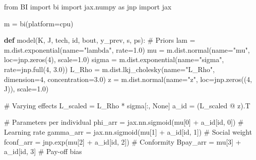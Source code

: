 \documentclass[
  letterpaper,
  DIV=11,
  numbers=noendperiod]{scrartcl}
\newenvironment{Shaded}{\begin{snugshade}}{\end{snugshade}}
\newcommand{\BuiltInTok}[1]{\textcolor[rgb]{0.00,0.23,0.31}{#1}}
\newcommand{\CommentTok}[1]{\textcolor[rgb]{0.37,0.37,0.37}{#1}}
\newcommand{\DecValTok}[1]{\textcolor[rgb]{0.68,0.00,0.00}{#1}}
\newcommand{\FloatTok}[1]{\textcolor[rgb]{0.68,0.00,0.00}{#1}}
\newcommand{\ImportTok}[1]{\textcolor[rgb]{0.00,0.46,0.62}{#1}}
\newcommand{\KeywordTok}[1]{\textcolor[rgb]{0.00,0.23,0.31}{\textbf{#1}}}
\newcommand{\NormalTok}[1]{\textcolor[rgb]{0.00,0.23,0.31}{#1}}
\newcommand{\OperatorTok}[1]{\textcolor[rgb]{0.37,0.37,0.37}{#1}}
\newcommand{\StringTok}[1]{\textcolor[rgb]{0.13,0.47,0.30}{#1}}
\newcommand{\VariableTok}[1]{\textcolor[rgb]{0.07,0.07,0.07}{#1}}
\begin{document}
\begin{Shaded}
\begin{Highlighting}[]
\ImportTok{from}\NormalTok{ BI }\ImportTok{import}\NormalTok{ bi}
\ImportTok{import}\NormalTok{ jax.numpy }\ImportTok{as}\NormalTok{ jnp}
\ImportTok{import}\NormalTok{ jax}

\NormalTok{m }\OperatorTok{=}\NormalTok{ bi(platform}\OperatorTok{=}\StringTok{\textquotesingle{}cpu\textquotesingle{}}\NormalTok{)}

\KeywordTok{def}\NormalTok{ model(K, J, tech, }\BuiltInTok{id}\NormalTok{, bout, y\_prev, s, ps):}
    \CommentTok{\# Priors}
\NormalTok{    lam   }\OperatorTok{=}\NormalTok{ m.dist.exponential(name}\OperatorTok{=}\StringTok{"lambda"}\NormalTok{, rate}\OperatorTok{=}\FloatTok{1.0}\NormalTok{)}
\NormalTok{    mu    }\OperatorTok{=}\NormalTok{ m.dist.normal(name}\OperatorTok{=}\StringTok{"mu"}\NormalTok{, loc}\OperatorTok{=}\NormalTok{jnp.zeros(}\DecValTok{4}\NormalTok{), scale}\OperatorTok{=}\FloatTok{1.0}\NormalTok{)}
\NormalTok{    sigma }\OperatorTok{=}\NormalTok{ m.dist.exponential(name}\OperatorTok{=}\StringTok{"sigma"}\NormalTok{, rate}\OperatorTok{=}\NormalTok{jnp.full(}\DecValTok{4}\NormalTok{, }\FloatTok{3.0}\NormalTok{))}
\NormalTok{    L\_Rho }\OperatorTok{=}\NormalTok{ m.dist.lkj\_cholesky(name}\OperatorTok{=}\StringTok{"L\_Rho"}\NormalTok{, dimension}\OperatorTok{=}\DecValTok{4}\NormalTok{, concentration}\OperatorTok{=}\FloatTok{3.0}\NormalTok{)}
\NormalTok{    z     }\OperatorTok{=}\NormalTok{ m.dist.normal(name}\OperatorTok{=}\StringTok{"z"}\NormalTok{, loc}\OperatorTok{=}\NormalTok{jnp.zeros((}\DecValTok{4}\NormalTok{, J)), scale}\OperatorTok{=}\FloatTok{1.0}\NormalTok{)}

    \CommentTok{\# Varying effects}
\NormalTok{    L\_scaled }\OperatorTok{=}\NormalTok{ L\_Rho }\OperatorTok{*}\NormalTok{ sigma[:, }\VariableTok{None}\NormalTok{]}
\NormalTok{    a\_id     }\OperatorTok{=}\NormalTok{ (L\_scaled }\OperatorTok{@}\NormalTok{ z).T}

    \CommentTok{\# Parameters per individual}
\NormalTok{    phi\_arr   }\OperatorTok{=}\NormalTok{ jax.nn.sigmoid(mu[}\DecValTok{0}\NormalTok{] }\OperatorTok{+}\NormalTok{ a\_id[}\BuiltInTok{id}\NormalTok{, }\DecValTok{0}\NormalTok{])      }\CommentTok{\# Learning rate}
\NormalTok{    gamma\_arr }\OperatorTok{=}\NormalTok{ jax.nn.sigmoid(mu[}\DecValTok{1}\NormalTok{] }\OperatorTok{+}\NormalTok{ a\_id[}\BuiltInTok{id}\NormalTok{, }\DecValTok{1}\NormalTok{])      }\CommentTok{\# Social weight}
\NormalTok{    fconf\_arr }\OperatorTok{=}\NormalTok{ jnp.exp(mu[}\DecValTok{2}\NormalTok{] }\OperatorTok{+}\NormalTok{ a\_id[}\BuiltInTok{id}\NormalTok{, }\DecValTok{2}\NormalTok{])             }\CommentTok{\# Conformity}
\NormalTok{    Bpay\_arr  }\OperatorTok{=}\NormalTok{ mu[}\DecValTok{3}\NormalTok{] }\OperatorTok{+}\NormalTok{ a\_id[}\BuiltInTok{id}\NormalTok{, }\DecValTok{3}\NormalTok{]                      }\CommentTok{\# Pay{-}off bias}


\end{Highlighting}
\end{Shaded}
\end{document}
